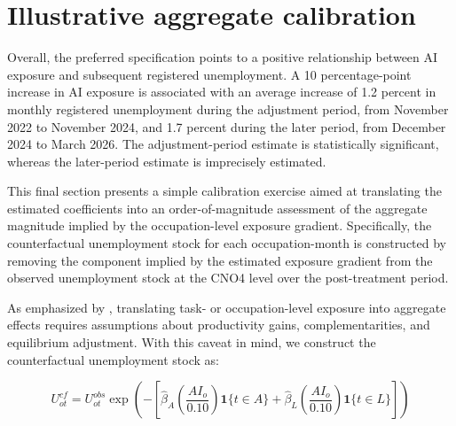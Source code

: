 \clearpage





\clearpage
\section{Illustrative aggregate calibration}
\label{app:v1_aggregate_calibration}


Overall, the preferred specification points to a positive relationship between AI exposure and subsequent registered unemployment. A 10 percentage-point increase in AI exposure is associated with an average increase of 1.2 percent in monthly registered unemployment during the adjustment period, from November 2022 to November 2024, and 1.7 percent during the later period, from December 2024 to March 2026. The adjustment-period estimate is statistically significant, whereas the later-period estimate is imprecisely estimated.

This final section presents a simple calibration exercise aimed at translating the estimated coefficients into an order-of-magnitude assessment of the aggregate magnitude implied by the occupation-level exposure gradient. Specifically, the counterfactual unemployment stock for each occupation-month is constructed by removing the component implied by the estimated exposure gradient from the observed unemployment stock at the CNO4 level over the post-treatment period.

As emphasized by \citet{acemoglu_2025}, translating task- or occupation-level exposure into aggregate effects requires assumptions about productivity gains, complementarities, and equilibrium adjustment. With this caveat in mind, we construct the counterfactual unemployment stock as:

\begin{equation}
U^{cf}_{ot}
=
U^{obs}_{ot}
\exp\left(
-
\left[
\hat{\beta}_{A}\left(\frac{AI_o}{0.10}\right)\mathbf{1}\{t \in A\}
+
\hat{\beta}_{L}\left(\frac{AI_o}{0.10}\right)\mathbf{1}\{t \in L\}
\right]
\right)
\end{equation}

